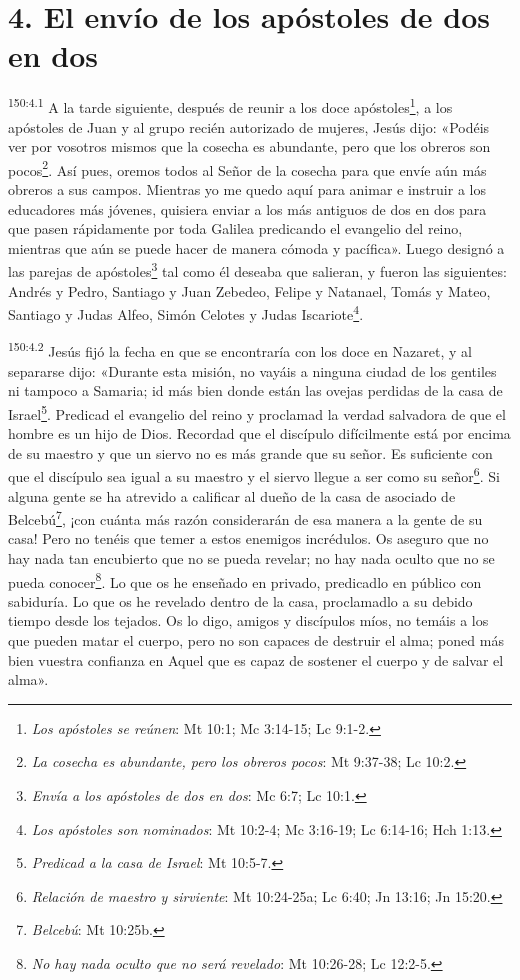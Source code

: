 \section*{4. El envío de los apóstoles de dos en dos}
\par
\textsuperscript{150:4.1} A la tarde siguiente, después de reunir a los doce apóstoles\footnote{\textit{Los apóstoles se reúnen}: Mt 10:1; Mc 3:14-15; Lc 9:1-2.}, a los apóstoles de Juan y al grupo recién autorizado de mujeres, Jesús dijo: «Podéis ver por vosotros mismos que la cosecha es abundante, pero que los obreros son pocos\footnote{\textit{La cosecha es abundante, pero los obreros pocos}: Mt 9:37-38; Lc 10:2.}. Así pues, oremos todos al Señor de la cosecha para que envíe aún más obreros a sus campos. Mientras yo me quedo aquí para animar e instruir a los educadores más jóvenes, quisiera enviar a los más antiguos de dos en dos para que pasen rápidamente por toda Galilea predicando el evangelio del reino, mientras que aún se puede hacer de manera cómoda y pacífica». Luego designó a las parejas de apóstoles\footnote{\textit{Envía a los apóstoles de dos en dos}: Mc 6:7; Lc 10:1.} tal como él deseaba que salieran, y fueron las siguientes: Andrés y Pedro, Santiago y Juan Zebedeo, Felipe y Natanael, Tomás y Mateo, Santiago y Judas Alfeo, Simón Celotes y Judas Iscariote\footnote{\textit{Los apóstoles son nominados}: Mt 10:2-4; Mc 3:16-19; Lc 6:14-16; Hch 1:13.}.

\par
\textsuperscript{150:4.2} Jesús fijó la fecha en que se encontraría con los doce en Nazaret, y al separarse dijo: «Durante esta misión, no vayáis a ninguna ciudad de los gentiles ni tampoco a Samaria; id más bien donde están las ovejas perdidas de la casa de Israel\footnote{\textit{Predicad a la casa de Israel}: Mt 10:5-7.}. Predicad el evangelio del reino y proclamad la verdad salvadora de que el hombre es un hijo de Dios. Recordad que el discípulo difícilmente está por encima de su maestro y que un siervo no es más grande que su señor. Es suficiente con que el discípulo sea igual a su maestro y el siervo llegue a ser como su señor\footnote{\textit{Relación de maestro y sirviente}: Mt 10:24-25a; Lc 6:40; Jn 13:16; Jn 15:20.}. Si alguna gente se ha atrevido a calificar al dueño de la casa de asociado de Belcebú\footnote{\textit{Belcebú}: Mt 10:25b.}, ¡con cuánta más razón considerarán de esa manera a la gente de su casa! Pero no tenéis que temer a estos enemigos incrédulos. Os aseguro que no hay nada tan encubierto que no se pueda revelar; no hay nada oculto que no se pueda conocer\footnote{\textit{No hay nada oculto que no será revelado}: Mt 10:26-28; Lc 12:2-5.}. Lo que os he enseñado en privado, predicadlo en público con sabiduría. Lo que os he revelado dentro de la casa, proclamadlo a su debido tiempo desde los tejados. Os lo digo, amigos y discípulos míos, no temáis a los que pueden matar el cuerpo, pero no son capaces de destruir el alma; poned más bien vuestra confianza en Aquel que es capaz de sostener el cuerpo y de salvar el alma».

